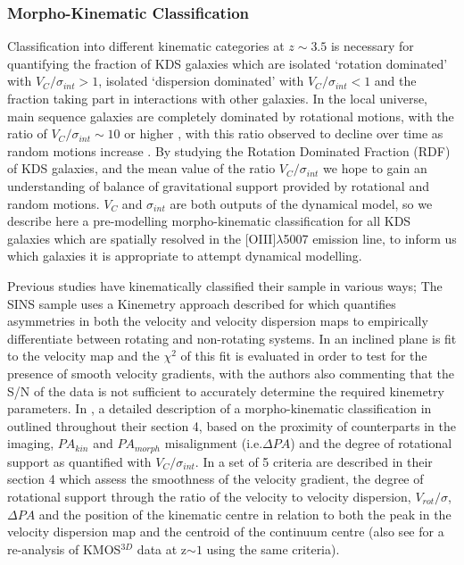 \documentclass[fleqn,usenatbib]{mn2e}
\begin{document}
\subsubsection{Morpho-Kinematic Classification}\label{subsec:morpho-kin-class}
Classification into different kinematic categories at $z \sim 3.5$ is necessary for quantifying the fraction of KDS galaxies which are isolated `rotation dominated' with $V_{C}/\sigma_{int} > 1$, isolated `dispersion dominated' with $V_{C}/\sigma_{int} < 1$ and the fraction taking part in interactions with other galaxies.
In the local universe, main sequence galaxies are completely dominated by rotational motions, with the ratio of $V_{C}/\sigma_{int} \sim 10$ or higher \citep{Epinat2008,Epinat2008a}, with this ratio observed to decline over time as random motions increase \citep[e.g.][]{ForsterSchreiber2009,Law2009,Epinat2012,Wisnioski2015,Stott2016}.
By studying the Rotation Dominated Fraction (RDF) of KDS galaxies, and the mean value of the ratio $V_{C}/\sigma_{int}$ we hope to gain an understanding of balance of gravitational support provided by rotational and random motions.
$V_{C}$ and $\sigma_{int}$ are both outputs of the dynamical model, so we describe here a pre-modelling morpho-kinematic classification for all KDS galaxies which are spatially resolved in the [OIII]$\lambda$5007 emission line, to inform us which galaxies it is appropriate to attempt dynamical modelling. 

Previous studies have kinematically classified their sample in various ways; The SINS sample uses a Kinemetry approach described for \citep{Shapiro2008,ForsterSchreiber2009,Cresci2009} which quantifies asymmetries in both the velocity and velocity dispersion maps to empirically differentiate between rotating and non-rotating systems.
In \cite{Gnerucci2011} an inclined plane is fit to the velocity map and the $\chi^{2}$ of this fit is evaluated in order to test for the presence of smooth velocity gradients, with the authors also commenting that the S/N of the data is not sufficient to accurately determine the required kinemetry parameters.
In \cite{Epinat2012}, a detailed description of a morpho-kinematic classification in outlined throughout their section 4, based on the proximity of counterparts in the imaging, $PA_{kin}$ and $PA_{morph}$ misalignment (i.e.$\Delta PA$) and the degree of rotational support as quantified with $V_{C}/\sigma_{int}$.
In \cite{Wisnioski2015} a set of 5 criteria are described in their section 4 which assess the smoothness of the velocity gradient, the degree of rotational support through the ratio of the velocity to velocity dispersion, $V_{rot}/\sigma$, $\Delta PA$ and the position of the kinematic centre in relation to both the peak in the velocity dispersion map and the centroid of the continuum centre (also see \cite{Rodrigues2016} for a re-analysis of KMOS$^{3D}$ data at z$\sim 1$ using the same criteria).
\end{document}
